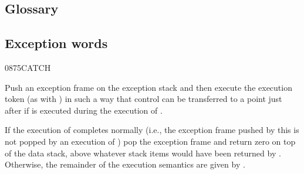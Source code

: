 \begin{intro}
\subsection{Glossary} %
\end{intro}

\subsection{Exception words} %

\begin{worddef}{0875}{CATCH}
\item {}

	Push an exception frame on the exception stack and then execute
	the execution token  (as with ) in
	such a way that control can be transferred to a point just after
	 if  is executed during the execution of
	.

	If the execution of  completes normally (i.e., the
	exception frame pushed by this  is not popped by an
	execution of ) pop the exception frame and return
	zero on top of the data stack, above whatever stack items would
	have been returned by  . Otherwise,
	the remainder of the execution semantics are given by
	.
\end{worddef}


